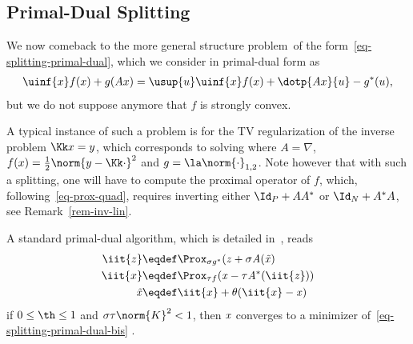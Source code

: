 \subsection{Primal-Dual Splitting}

We now comeback to the more general structure problem of the form~\eqref{eq-splitting-primal-dual}, which we consider in primal-dual form as
\begin{align}\label{eq-splitting-primal-dual-bis}
	\uinf{x} f(x) + g(Ax) 
	= \usup{u} \uinf{x} f(x) + \dotp{Ax}{u}  - g^*(u), 
\end{align}
but we do not suppose anymore that $f$ is strongly convex. 

A typical instance of such a problem is for the TV regularization of the inverse problem $\Kk x=y$, which corresponds to solving
where $A=\nabla$, $f(x)=\frac{1}{2}\norm{y-\Kk \cdot}^2$ and $g=\la \norm{\cdot}_{1,2}$.
%
Note however that with such a splitting, one will have to compute the proximal operator of $f$, which, following~\eqref{eq-prox-quad}, requires inverting either $\Id_P+AA^*$ or $\Id_N+A^*A$, see Remark~\ref{rem-inv-lin}. 

A standard primal-dual algorithm, which is detailed in~\cite{}, reads
\begin{align*}
	\iit{z} &\eqdef \Prox_{\sigma g^*}( \it{z} + \sigma A( \it{\tilde x}) \\
	\iit{x} &\eqdef \Prox_{\tau f}(  \it{x}-\tau A^*(\iit{z}) ) \\
	 \it{\tilde x} &\eqdef \iit{x} + \theta (\iit{x} - \it{x}) 
\end{align*}
if $0 \leq \th \leq 1$ and $\sigma \tau \norm{K}^2<1$, then $\it{x}$ converges to a minimizer of~\eqref{eq-splitting-primal-dual-bis} .
